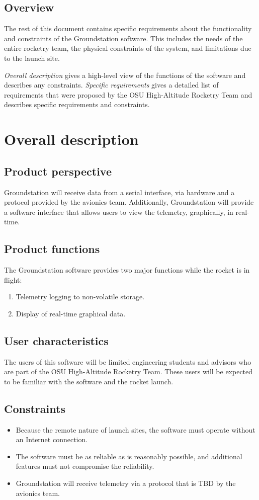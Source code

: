 \documentclass[10pt,journal,draftclsnofoot,onecolumn]{IEEEtran}
\begin{document}
	\subsection{Overview}
	The rest of this document contains specific requirements about the functionality and constraints of the Groundstation software. This includes the needs of the entire rocketry team, the physical constraints of the system, and limitations due to the launch site.
	
	\textit{Overall description} gives a high-level view of the functions of the software and describes any constraints.
	\textit{Specific requirements} gives a detailed list of requirements that were proposed by the OSU High-Altitude Rocketry Team and describes specific requirements and constraints.
		
	
	\section{Overall description}
	\subsection{Product perspective}
	Groundstation will receive data from a serial interface, via hardware and a protocol provided by the avionics team.
	Additionally, Groundstation will provide a software interface that allows users to view the telemetry, graphically, in real-time.
	\subsection{Product functions}
	The Groundstation software provides two major functions while the rocket is in flight:
	
	\begin{enumerate}
		\item Telemetry logging to non-volatile storage.
		\item Display of real-time graphical data. 
	\end{enumerate}
	
	\subsection{User characteristics}
	The users of this software will be limited engineering students and advisors who are part of the OSU High-Altitude Rocketry Team.
	These users will be expected to be familiar with the software and the rocket launch.
	
	\subsection{Constraints}
	\begin{itemize}
		\item Because the remote nature of launch sites, the software must operate without an Internet connection.
		\item The software must be as reliable as is reasonably possible, and additional features must not compromise the reliability.
		\item Groundstation will receive telemetry via a protocol that is TBD by the avionics team.
	\end{itemize}
\end{document}
